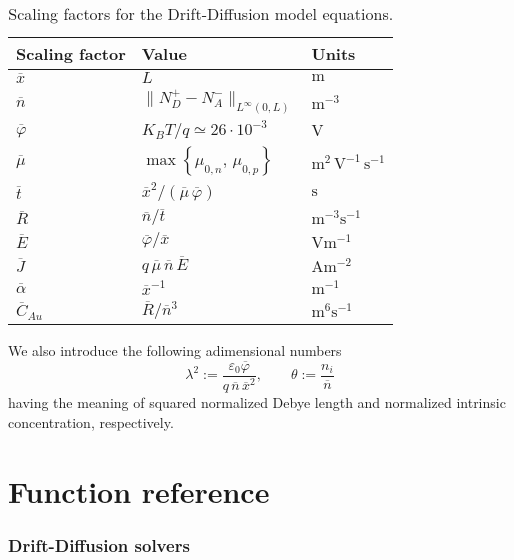 \documentclass[9pt]{amsart}
\newcommand{\unit}[1]{\mathrm{#1}}
\newcommand{\meter}{\unit{m}}
\newcommand{\second}{\unit{s}}
\newcommand{\volt}{\unit{V}}
\newcommand{\Ampere}{\unit{A}}
\begin{document}
\begin{table}[h!]
\begin{center}
\begin{tabular}{lll}\hline
\textbf{Scaling factor}	& \textbf{Value} & \textbf{Units}\\ \hline
$\overline{x}$            & $L$            & $\meter$ \\[1mm]
$\overline{n}$            & $\| N_D^+ - N_A^-\|_{L^{\infty}(0,L)}$  
& $\meter^{-3}$ \\[1mm]
$\overline{\varphi}$      & $K_B T / q \simeq 26 \cdot 10^{-3}$ 
& $\volt$ \\[1mm]
$\overline{\mu}$          & $\max\left\{ \mu_{0,n}, \, \mu_{0,p}\right\}$ 
&  $\meter^2\,\volt^{-1}\,\second^{-1}$ \\[1mm]
$\overline{t}$          & $\overline{x}^2/(\overline{\mu} \, \overline{\varphi})$
&  $\second$ \\[1mm]
$\overline{R}$          & $\overline{n}/\overline{t}$
&  $\meter^{-3} \second^{-1}$ \\[1mm]
$\overline{E}$          & $\overline{\varphi}/\overline{x}$
&  $\volt \meter^{-1}$  \\[1mm]
$\overline{J}$          & $q \, \overline{\mu} \, \overline{n} \, 
\overline{E}$ &  $\Ampere \meter^{-2}$  \\[1mm]
$\overline{\alpha}$ & $\overline{x}^{-1}$ & $\meter^{-1}$ \\[1mm]
$\overline{C}_{Au}$ & $\overline{R}/\overline{n}^3$ & 
$\meter^{6} \second^{-1}$ \\[1mm]
\hline
\end{tabular}
\caption{Scaling factors for the Drift-Diffusion model equations.}
\label{tab:model_param_1d}
\end{center}
\end{table}

We also introduce the following adimensional numbers
$$
\lambda^2:= \displaystyle \frac{\varepsilon_0 \overline{\varphi}}
{q \, \overline{n} \, \overline{x}^2}, \qquad
\theta:= \displaystyle \frac{n_i}{\overline{n}}
$$
having the meaning of squared normalized Debye length and
normalized intrinsic concentration, respectively.

\part{Function reference}

\section{Drift-Diffusion solvers}
\end{document}
